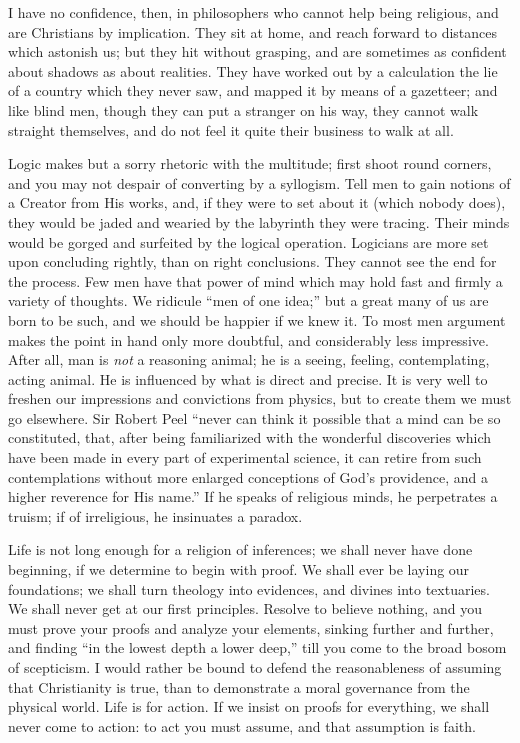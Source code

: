 I have no confidence, then, in philosophers who cannot help being
religious, and are Christians by implication. They sit at home, and
reach forward to distances which astonish us; but they hit without
grasping, and are sometimes as confident about shadows as about
realities. They have worked out by a calculation the lie of a country
which they never saw, and mapped it by means of a gazetteer; and like
blind men, though they can put a stranger on his way, they cannot walk
straight themselves, and do not feel it quite their business to walk
at all.

Logic makes but a sorry rhetoric with the multitude; first shoot
round corners, and you may not despair of converting by a syllogism.
Tell men to gain notions of a Creator from His works, and, if they
were to set about it (which nobody does), they would be jaded and
wearied by the labyrinth they were tracing. Their minds would be
gorged and surfeited by the logical operation. Logicians are more set
upon concluding rightly, than on right conclusions. They cannot see
the end for the process. Few men have that power of mind which may
hold fast and firmly a variety of thoughts. We ridicule ``men of
one idea;'' but a great many of us are born to be such, and we
should be happier if we knew it. To most men argument makes the point
in hand only more doubtful, and considerably less impressive. After
all, man is \emph{not} a reasoning animal; he is a seeing, feeling,
contemplating, acting animal. He is influenced by what is direct and
precise. It is very well to freshen our impressions and convictions
from physics, but to create them we must go elsewhere. Sir Robert Peel
``never can think it possible that a mind can be so constituted,
that, after being familiarized with the wonderful discoveries which
have been made in every part of experimental science, it can retire from such contemplations without more enlarged conceptions of
God's providence, and a higher reverence for His name.'' If he
speaks of religious minds, he perpetrates a truism; if of irreligious,
he insinuates a paradox.

Life is not long enough for a religion of inferences; we shall
never have done beginning, if we determine to begin with proof. We
shall ever be laying our foundations; we shall turn theology into
evidences, and divines into textuaries. We shall never get at our
first principles. Resolve to believe nothing, and you must prove your
proofs and analyze your elements, sinking further and further, and
finding ``in the lowest depth a lower deep,'' till you come to
the broad bosom of scepticism. I would rather be bound to defend the
reasonableness of assuming that Christianity is true, than to
demonstrate a moral governance from the physical world. Life is for
action. If we insist on proofs for everything, we shall never come to
action: to act you must assume, and that assumption is faith.

